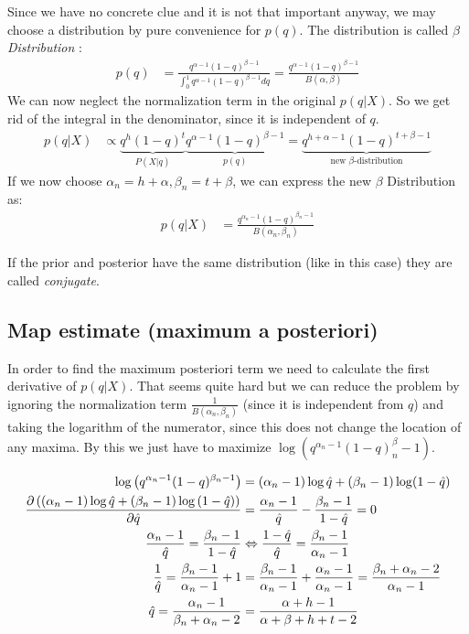 Since we have no concrete clue and it is not that important anyway, we may choose a distribution by pure convenience for $p(q)$. The distribution is called \textit{$\beta$ Distribution} :
\begin{align*}
p(q) &= \frac{q^{\alpha-1}(1-q)^{\beta-1}}{\int_0^1 q^{\alpha-1}(1-q)^{\beta-1}dq} = \frac{q^{\alpha-1}(1-q)^{\beta-1}}{B(\alpha,\beta)}
\end{align*}
We can now neglect the normalization term in the original $p(q|X)$. So we get rid of the integral in the denominator, since it is independent of $q$.
\begin{align*}
p(q|X) &\propto \underbrace{q^h(1-q)^t}_{P(X|q)} \underbrace{q^{\alpha-1}(1-q)^{\beta-1}}_{p(q)} = \underbrace{q^{h+\alpha-1}(1-q)^{t+\beta-1}}_\text{new $\beta$-distribution}
\end{align*}
If we now choose $\alpha_n = h+\alpha, \beta_n = t+\beta$, we can express the new $\beta$ Distribution as:
\begin{align*}
p(q|X) &= \frac{q^{\alpha_n-1}(1-q)^{\beta_n-1}}{B(\alpha_n, \beta_n)} 
\end{align*}

If the prior and posterior have the same distribution (like in this case) they are called \textit{conjugate}.

\subsection{Map estimate (maximum a posteriori)}
In order to find the maximum posteriori term we need to calculate the first derivative of $p(q|X)$. That seems quite hard but we can reduce the problem by ignoring the normalization term $\frac{1}{B(\alpha_n, \beta_n)}$ (since it is independent from $q$) and taking the logarithm of the numerator, since this does not change the location of any maxima. By this we just have to maximize $\log(q^{\alpha_n-1}(1-q)^\beta_n-1)$.

\begin{align*}
\log{\left(q^{\alpha_n-1}(1-q)^{\beta_n-1}\right)} &= (\alpha_n-1)\log \est{q} + (\beta_n-1)\log (1-\est{q}) \\
\frac{\partial \left(\left(\alpha_n-1\right)\log \est{q} + \left(\beta_n-1\right)\log \left(1-\est{q}\right)\right)}{\partial \est{q}} &= \frac{\alpha_n-1}{\est{q}} - \frac{\beta_n-1}{1-\est{q}} = 0 \\
\frac{\alpha_n-1}{\est{q}} = \frac{\beta_n-1}{1-\est{q}} &\Leftrightarrow \frac{1-\est{q}}{\est{q}} = \frac{\beta_n-1}{\alpha_n-1} \\
\frac{1}{\est{q}} = \frac{\beta_n-1}{\alpha_n-1}+1 &= \frac{\beta_n-1}{\alpha_n-1} + \frac{\alpha_n-1}{\alpha_n-1} = \frac{\beta_n+\alpha_n-2}{\alpha_n-1} \\
\est{q} = \frac{\alpha_n-1}{\beta_n+\alpha_n-2} &= \frac{\alpha+h-1}{\alpha+\beta+h+t-2}
\end{align*}


